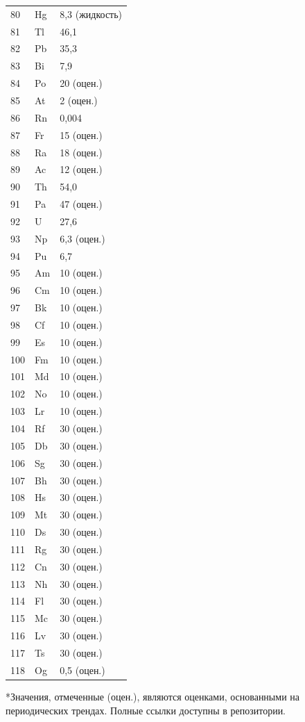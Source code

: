 \documentclass[12pt,a4paper]{article}
\begin{document}
\begin{longtable}{p{0.6cm}p{1.2cm}p{1.5cm}}
		80 & Hg & 8,3 (жидкость) \\
		81 & Tl & 46,1 \\
		82 & Pb & 35,3 \\
		83 & Bi & 7,9 \\
		84 & Po & 20 (оцен.) \\
		85 & At & 2 (оцен.) \\
		86 & Rn & 0,004 \\
		87 & Fr & 15 (оцен.) \\
		88 & Ra & 18 (оцен.) \\
		89 & Ac & 12 (оцен.) \\
		90 & Th & 54,0 \\
		91 & Pa & 47 (оцен.) \\
		92 & U  & 27,6 \\
		93 & Np & 6,3 (оцен.) \\
		94 & Pu & 6,7 \\
		95 & Am & 10 (оцен.) \\
		96 & Cm & 10 (оцен.) \\
		97 & Bk & 10 (оцен.) \\
		98 & Cf & 10 (оцен.) \\
		99 & Es & 10 (оцен.) \\
		100& Fm & 10 (оцен.) \\
		101& Md & 10 (оцен.) \\
		102& No & 10 (оцен.) \\
		103& Lr & 10 (оцен.) \\
		104& Rf & 30 (оцен.) \\
		105& Db & 30 (оцен.) \\
		106& Sg & 30 (оцен.) \\
		107& Bh & 30 (оцен.) \\
		108& Hs & 30 (оцен.) \\
		109& Mt & 30 (оцен.) \\
		110& Ds & 30 (оцен.) \\
		111& Rg & 30 (оцен.) \\
		112& Cn & 30 (оцен.) \\
		113& Nh & 30 (оцен.) \\
		114& Fl & 30 (оцен.) \\
		115& Mc & 30 (оцен.) \\
		116& Lv & 30 (оцен.) \\
		117& Ts & 30 (оцен.) \\
		118& Og & 0,5 (оцен.) \\
		\bottomrule
	\end{longtable}
	*Значения, отмеченные (оцен.), являются оценками, основанными на периодических трендах. Полные ссылки доступны в репозитории.
	
\end{document}
